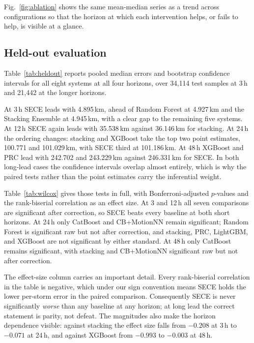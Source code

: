 \documentclass{ametsocv6.1}
\newcommand{\sece}{SECE}
\begin{document}
Fig.~\ref{fig:ablation} shows the same mean-median series as a trend across configurations so that the horizon at which each intervention helps, or fails to help, is visible at a glance.

\subsection{Held-out evaluation}
\label{sec:heldout}
Table~\ref{tab:heldout} reports pooled median errors and bootstrap confidence
intervals for all eight systems at all four horizons, over 34{,}114 test samples
at 3\,h and 21{,}442 at the longer horizons.

At 3\,h \sece{} leads with 4.895\,km, ahead of Random Forest at 4.927\,km and the
Stacking Ensemble at 4.945\,km, with a clear gap to the remaining five systems. At
12\,h \sece{} again leads with 35.538\,km against 36.146\,km for stacking. At
24\,h the ordering changes: stacking and XGBoost take the top two point estimates,
100.771 and 101.029\,km, with \sece{} third at 101.186\,km. At 48\,h XGBoost and
PRC lead with 242.702 and 243.229\,km against 246.331\,km for \sece{}. In both
long-lead cases the confidence intervals overlap almost entirely, which is why the
paired tests rather than the point estimates carry the inferential weight.

Table~\ref{tab:wilcox} gives those tests in full, with Bonferroni-adjusted
$p$-values and the rank-biserial correlation as an effect size. At 3 and 12\,h all
seven comparisons are significant after correction, so \sece{} beats every
baseline at both short horizons. At 24\,h only CatBoost and CB+MotionNN remain
significant; Random Forest is significant raw but not after correction, and
stacking, PRC, LightGBM, and XGBoost are not significant by either standard. At
48\,h only CatBoost remains significant, with stacking and CB+MotionNN
significant raw but not after correction.

The effect-size column carries an important detail. Every rank-biserial
correlation in the table is negative, which under our sign convention means
\sece{} holds the lower per-storm error in the paired comparison. Consequently
\sece{} is never significantly \emph{worse} than any baseline at any horizon; at
long lead the correct statement is parity, not defeat. The magnitudes also make
the horizon dependence visible: against stacking the effect size falls from
$-0.208$ at 3\,h to $-0.071$ at 24\,h, and against XGBoost from $-0.993$ to
$-0.003$ at 48\,h.
\end{document}
